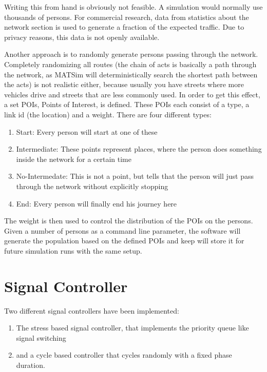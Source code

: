 Writing this from hand is obviously not feasible. A simulation would normally use thousands of persons. For commercial research, data from statistics about the network section is used to generate a fraction of the expected traffic. Due to privacy reasons, this data is not openly available.

Another approach is to randomly generate persons passing through the network. Completely randomizing all routes (the chain of acts is basically a path through the network, as MATSim will deterministically search the shortest path between the acts) is not realistic either, because usually you have streets where more vehicles drive and streets that are less commonly used. In order to get this effect, a set POIs, Points of Interest, is defined. These POIs each consist of a type, a link id (the location) and a weight. There are four different types:

\begin{enumerate}
	\item Start: Every person will start at one of these
	\item Intermediate: These points represent places, where the person does something inside the network for a certain time
	\item No-Intermedate: This is not a point, but tells that the person will just pass through the network without explicitly stopping
	\item End: Every person will finally end his journey here
\end{enumerate}

The weight is then used to control the distribution of the POIs on the persons. Given a number of persons as a command line parameter, the software will generate the population based on the defined POIs and keep will store it for future simulation runs with the same setup.

\section{Signal Controller}

Two different signal controllers have been implemented:

\begin{enumerate}
	\item The stress based signal controller, that implements the priority queue like signal switching
	\item and a cycle based controller that cycles randomly with a fixed phase duration.
\end{enumerate}

